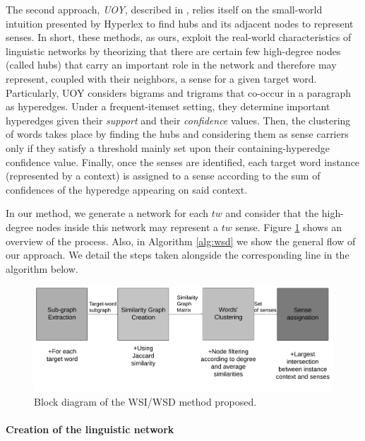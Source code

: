 The second approach, \textit{UOY}, described in \cite{2007.Klapaftis.UOY},  relies itself on the small-world intuition presented  by Hyperlex to find hubs and its adjacent nodes to represent senses.   In short, these methods, as ours, exploit the real-world characteristics of linguistic networks by theorizing that there are certain few high-degree nodes (called hubs) that carry an important role in the network and therefore may represent, coupled with their neighbors, a sense for a given target word. Particularly, UOY considers bigrams and trigrams that co-occur in a paragraph as hyperedges. Under a frequent-itemset setting, they determine important hyperedges given their \textit{support} and their \textit{confidence}  values. Then, the clustering of words takes place by finding the hubs and considering them as sense carriers only if they satisfy a threshold mainly set upon their containing-hyperedge confidence value. Finally, once the senses are identified, each target word instance (represented by a context) is assigned to a sense according to the sum of confidences of the hyperedge appearing on said context. 

In our method, we generate a network for each $tw$ and consider that the high-degree nodes inside this network may represent a $tw$ sense. Figure \ref{fig:wsd_wsi_process}  shows an overview of the process. Also, in Algorithm \ref{alg:wsd} we show the general flow of our approach.  We detail the steps taken alongside the corresponding line in the algorithm below. 

\begin{figure}
\centering
\includegraphics[width=1\linewidth]{images/Chapitre4/wsd_wsi_process.png}
\caption{Block diagram of the WSI/WSD method proposed.}
\label{fig:wsd_wsi_process}
\end{figure}


\paragraph{Creation of the linguistic network}

